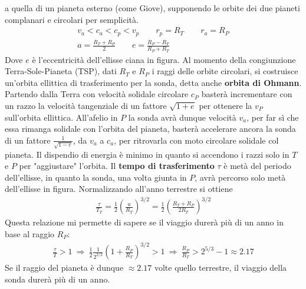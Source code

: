 \documentclass[a4paper, oneside]{book}
\begin{document}
a quella di un pianeta esterno (come Giove), supponendo le 
orbite dei due pianeti complanari e circolari 
per semplicità.
\begin{gather*}
    v_a < c_a < c_p < v_p \qquad  r_p = R_T \qquad r_a = R_P \\
    a = \frac{R_T + R_P}{2} \qquad e = \frac{R_P - R_T}{R_P + R_T}
\end{gather*}
Dove $e$ è l'eccentricità dell'ellisse ciana in figura.
Al momento della congiunzione Terra-Sole-Pianeta (TSP), dati 
$R_T$ e $R_P$ i raggi delle orbite circolari, 
si costruisce un'orbita ellittica di trasferimento per 
la sonda, detta anche \textbf{orbita di Ohmann}. Partendo dalla 
Terra con velocità solidale circolare $c_P$ basterà 
incrementare con un razzo la velocità tangenziale di un fattore $\sqrt{1 + e}$
per ottenere la $v_P$ sull'orbita ellittica. 
All'afelio in $P$ la sonda avrà dunque velocità $v_a$, per far sì 
che essa rimanga solidale con l'orbita del pianeta, basterà accelerare ancora la sonda di un fattore
$\frac{1}{\sqrt{1 - e} }$, da $v_a$ a $c_a$, per ritrovarla con 
moto circolare solidale col pianeta. Il dispendio di energia è minimo in quanto si accendono
i razzi solo in $T$ e $P$ per "aggiustare" l'orbita. Il \textbf{tempo di trasferimento} $\tau$ è metà del periodo 
dell'ellisse, in quanto la sonda, una volta giunta in $P$, avrà percorso solo metà 
dell'ellisse in figura. Normalizzando all'anno terrestre si ottiene
\begin{gather*}
    \frac{\tau}{T_T} = \frac{1}{2}\left(\frac{a}{R_T}\right)^{3/2} = \frac{1}{2}\left(\frac{R_T + R_P}{2R_T}\right)^{3/2}
\end{gather*}
Questa relazione mi permette di sapere se il viaggio durerà più di un anno in base al raggio $R_P$:
\begin{gather*}
    \frac{\tau}{T} > 1 \ \Longrightarrow \ \frac{1}{2}\frac{1}{2^{3/2}} \left(1 + \frac{R_P}{R_T}\right) ^{3/2} > 1 \ \Longrightarrow \ \frac{R_P}{R_T} > 2^{5/3} - 1 \approx 2.17
\end{gather*}
Se il raggio del pianeta è dunque $\approx 2.17$ volte quello terrestre, il viaggio della sonda durerà più di un anno.
\end{document}
